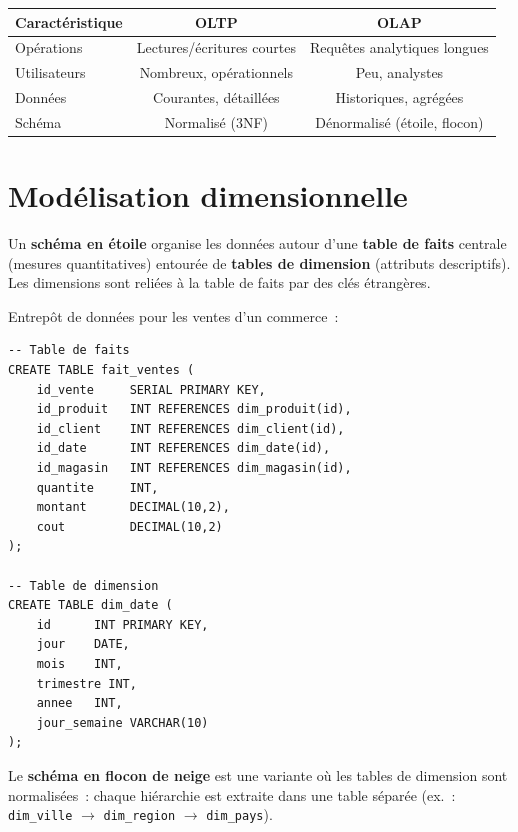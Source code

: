 \begin{center}
\begin{tabular}{lcc}
\hline
\textbf{Caract\'eristique} & \textbf{OLTP} & \textbf{OLAP} \\
\hline
Op\'erations & Lectures/\'ecritures courtes & Requ\^etes analytiques longues \\
Utilisateurs & Nombreux, op\'erationnels & Peu, analystes \\
Donn\'ees & Courantes, d\'etaill\'ees & Historiques, agr\'eg\'ees \\
Sch\'ema & Normalis\'e (3NF) & D\'enormalis\'e (\'etoile, flocon) \\
\hline
\end{tabular}
\end{center}

\section{Mod\'elisation dimensionnelle}

\begin{definition}
Un \textbf{sch\'ema en \'etoile} organise les donn\'ees autour d'une
\textbf{table de faits} centrale (mesures quantitatives) entour\'ee de
\textbf{tables de dimension} (attributs descriptifs). Les dimensions sont
reli\'ees \`a la table de faits par des cl\'es \'etrang\`eres.
\end{definition}

\begin{exemple}
Entrep\^ot de donn\'ees pour les ventes d'un commerce~:
\begin{verbatim}
-- Table de faits
CREATE TABLE fait_ventes (
    id_vente     SERIAL PRIMARY KEY,
    id_produit   INT REFERENCES dim_produit(id),
    id_client    INT REFERENCES dim_client(id),
    id_date      INT REFERENCES dim_date(id),
    id_magasin   INT REFERENCES dim_magasin(id),
    quantite     INT,
    montant      DECIMAL(10,2),
    cout         DECIMAL(10,2)
);

-- Table de dimension
CREATE TABLE dim_date (
    id      INT PRIMARY KEY,
    jour    DATE,
    mois    INT,
    trimestre INT,
    annee   INT,
    jour_semaine VARCHAR(10)
);
\end{verbatim}
\end{exemple}

\begin{definition}
Le \textbf{sch\'ema en flocon de neige} est une variante o\`u les tables
de dimension sont normalis\'ees~: chaque hi\'erarchie est extraite dans
une table s\'epar\'ee (ex.~: \texttt{dim\_ville} $\to$ \texttt{dim\_region}
$\to$ \texttt{dim\_pays}).
\end{definition}


